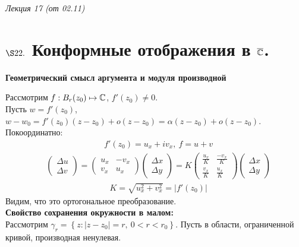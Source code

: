 \begin{flushright}
    \textit{Лекция 17 (от 02.11)}
\end{flushright}
\section{$\S 22.$ Конформные отображения в $\overline{\mathbb{C}}$.}
\begin{center}
    \textbf{Геометрический смысл аргумента и модуля производной}
\end{center}
Рассмотрим $f: B_r(z_0) \mapsto \mathbb{C}$, $f'(z_0) \neq 0$.
\\
Пусть $w = f'(z_0)$, $w-w_0 = f'(z_0)(z-z_0) + o(z-z_0) = \alpha (z-z_0) +
o(z-z_0)$.
\\
Покоординатно:
\begin{align*}
  & f'(z_0) = u_x+iv_x, \ f=u+v
\end{align*}
\begin{align*}
  & \left( \begin{matrix}
          \Delta u \\
          \Delta v
      \end{matrix} \right) = \left( \begin{matrix}
          u_x & -v_x \\
          v_x & u_x
      \end{matrix} \right)  \left( \begin{matrix}
          \Delta x \\
          \Delta y
      \end{matrix} \right) = K \left( \begin{matrix}
          \frac{u_x}{K} & \frac{-v_x}{K} \\
          \frac{v_x}{K} & \frac{u_x}{K}
      \end{matrix} \right) \left( \begin{matrix}
          \Delta x \\
          \Delta y
      \end{matrix} \right)
\end{align*}
\begin{align*}
  & K = \sqrt{u^2_x+v^2_x} = \left| f'(z_0) \right|
\end{align*}
Видим, что это ортогональное преобразование.
\\
\textbf{Свойство сохранения окружности в малом:}
\\
Рассмотрим $\gamma_r = \left\{ z: \left| z-z_0 \right| = r, \ 0 < r <
    r_0\right\}$. Пусть в области, ограниченной кривой, производная ненулевая.

